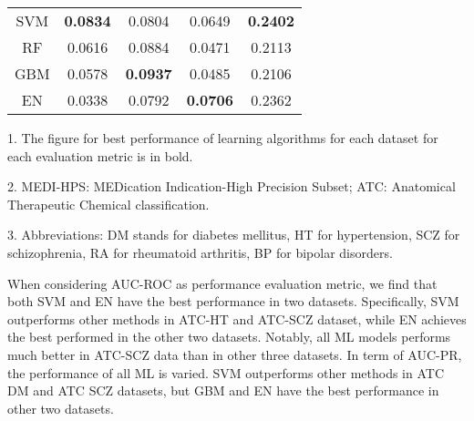 \begin{table}[htbp]
\begin{threeparttable}
\begin{tabular}{ccccc}
        SVM   & \textbf{0.0834} &     0.0804      &     0.0649      & \textbf{0.2402} \\
        RF    &     0.0616      &     0.0884      &     0.0471      &     0.2113 \\
        GBM   &     0.0578      & \textbf{0.0937} &     0.0485      &     0.2106 \\
        EN    &     0.0338      &     0.0792      & \textbf{0.0706} &     0.2362 \\
        \bottomrule
        \end{tabular}%
        \begin{tablenotes}
          \item 1. The figure for best performance of learning algorithms for each dataset for each evaluation metric is in bold.
          \item 2. MEDI-HPS: MEDication Indication-High Precision Subset; ATC: Anatomical Therapeutic Chemical classification.
          \item 3. Abbreviations: DM stands for diabetes mellitus, HT for hypertension, SCZ for schizophrenia, RA for rheumatoid arthritis, BP for bipolar disorders.          
        \end{tablenotes}
      \end{threeparttable}
      \label{tab:target_ml_performance}%
    \end{table}

    When considering AUC-ROC as performance evaluation metric, we find that both SVM and EN have the best performance in two datasets. Specifically, SVM outperforms other methods in ATC-HT and ATC-SCZ dataset, while EN achieves the best performed in the other two datasets. Notably, all ML models performs much better in ATC-SCZ data than in other three datasets. In term of AUC-PR, the performance of all ML is varied. SVM outperforms other methods in ATC DM and ATC SCZ datasets, but GBM and EN have the best performance in other two datasets.

